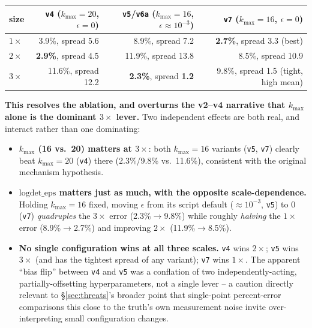 \documentclass[11pt]{article}
\begin{document}
\begin{center}
\begin{tabular}{lrrr}
\toprule
size & \texttt{v4} ($k_{\max}{=}20$, $\epsilon{=}0$) & \texttt{v5}/\texttt{v6a} ($k_{\max}{=}16$, $\epsilon{\approx}10^{-3}$) & \texttt{v7} ($k_{\max}{=}16$, $\epsilon{=}0$) \\
\midrule
$1\times$ & 3.9\%, spread 5.6  & 8.9\%, spread 7.2  & \textbf{2.7\%}, spread 3.3 (best) \\
$2\times$ & \textbf{2.9\%}, spread 4.5  & 11.9\%, spread 13.8 & 8.5\%, spread 10.9 \\
$3\times$ & 11.6\%, spread 12.2 & \textbf{2.3\%}, spread \textbf{1.2} & 9.8\%, spread 1.5 (tight, high mean) \\
\bottomrule
\end{tabular}
\end{center}

\textbf{This resolves the ablation, and overturns the v2--v4 narrative
that $k_{\max}$ alone is the dominant $3\times$ lever.} Two independent
effects are both real, and interact rather than one dominating:
\begin{itemize}[leftmargin=*]
\item \textbf{$k_{\max}$ (16 vs.\ 20) matters at $3\times$}: both
  $k_{\max}{=}16$ variants (\texttt{v5}, \texttt{v7}) clearly beat
  $k_{\max}{=}20$ (\texttt{v4}) there (2.3\%/9.8\% vs.\ 11.6\%),
  consistent with the original mechanism hypothesis.
\item \textbf{$\mathrm{logdet\_eps}$ matters just as much, with the
  opposite scale-dependence.} Holding $k_{\max}{=}16$ fixed, moving
  $\epsilon$ from its script default ($\approx10^{-3}$, \texttt{v5}) to
  $0$ (\texttt{v7}) \emph{quadruples} the $3\times$ error (2.3\%$\to$9.8\%)
  while roughly \emph{halving} the $1\times$ error (8.9\%$\to$2.7\%) and
  improving $2\times$ (11.9\%$\to$8.5\%).
\item \textbf{No single configuration wins at all three scales.}
  \texttt{v4} wins $2\times$; \texttt{v5} wins $3\times$ (and has the
  tightest spread of any variant); \texttt{v7} wins $1\times$. The
  apparent ``bias flip'' between \texttt{v4} and \texttt{v5} was a
  conflation of two independently-acting, partially-offsetting
  hyperparameters, not a single lever -- a caution directly relevant to
  \S\ref{sec:threats}'s broader point that single-point percent-error
  comparisons this close to the truth's own measurement noise invite
  over-interpreting small configuration changes.
\end{itemize}
\end{document}
